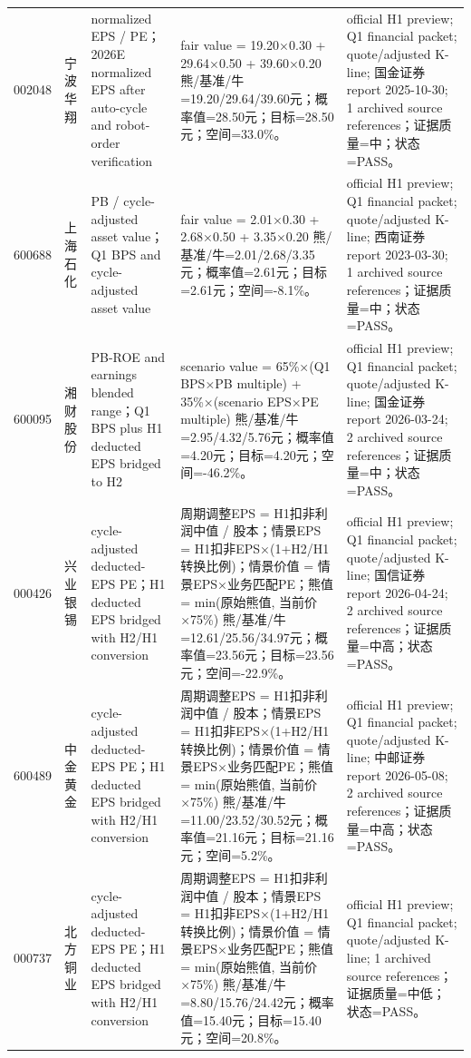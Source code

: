 \begin{longtable}{L{0.85cm}L{1.55cm}L{2.25cm}L{6.0cm}L{4.0cm}}
002048 & 宁波华翔 & normalized EPS / PE；2026E normalized EPS after auto-cycle and robot-order verification & fair value = 19.20×0.30 + 29.64×0.50 + 39.60×0.20 熊/基准/牛=19.20/29.64/39.60元；概率值=28.50元；目标=28.50元；空间=33.0\%。 & official H1 preview; Q1 financial packet; quote/adjusted K-line; 国金证券 report 2025-10-30; 1 archived source references；证据质量=中；状态=PASS。 \\
600688 & 上海石化 & PB / cycle-adjusted asset value；Q1 BPS and cycle-adjusted asset value & fair value = 2.01×0.30 + 2.68×0.50 + 3.35×0.20 熊/基准/牛=2.01/2.68/3.35元；概率值=2.61元；目标=2.61元；空间=-8.1\%。 & official H1 preview; Q1 financial packet; quote/adjusted K-line; 西南证券 report 2023-03-30; 1 archived source references；证据质量=中；状态=PASS。 \\
600095 & 湘财股份 & PB-ROE and earnings blended range；Q1 BPS plus H1 deducted EPS bridged to H2 & scenario value = 65\%×(Q1 BPS×PB multiple) + 35\%×(scenario EPS×PE multiple) 熊/基准/牛=2.95/4.32/5.76元；概率值=4.20元；目标=4.20元；空间=-46.2\%。 & official H1 preview; Q1 financial packet; quote/adjusted K-line; 国金证券 report 2026-03-24; 2 archived source references；证据质量=中；状态=PASS。 \\
000426 & 兴业银锡 & cycle-adjusted deducted-EPS PE；H1 deducted EPS bridged with H2/H1 conversion & 周期调整EPS = H1扣非利润中值 / 股本；情景EPS = H1扣非EPS×(1+H2/H1转换比例)；情景价值 = 情景EPS×业务匹配PE；熊值 = min(原始熊值, 当前价×75\%) 熊/基准/牛=12.61/25.56/34.97元；概率值=23.56元；目标=23.56元；空间=-22.9\%。 & official H1 preview; Q1 financial packet; quote/adjusted K-line; 国信证券 report 2026-04-24; 2 archived source references；证据质量=中高；状态=PASS。 \\
600489 & 中金黄金 & cycle-adjusted deducted-EPS PE；H1 deducted EPS bridged with H2/H1 conversion & 周期调整EPS = H1扣非利润中值 / 股本；情景EPS = H1扣非EPS×(1+H2/H1转换比例)；情景价值 = 情景EPS×业务匹配PE；熊值 = min(原始熊值, 当前价×75\%) 熊/基准/牛=11.00/23.52/30.52元；概率值=21.16元；目标=21.16元；空间=5.2\%。 & official H1 preview; Q1 financial packet; quote/adjusted K-line; 中邮证券 report 2026-05-08; 2 archived source references；证据质量=中高；状态=PASS。 \\
000737 & 北方铜业 & cycle-adjusted deducted-EPS PE；H1 deducted EPS bridged with H2/H1 conversion & 周期调整EPS = H1扣非利润中值 / 股本；情景EPS = H1扣非EPS×(1+H2/H1转换比例)；情景价值 = 情景EPS×业务匹配PE；熊值 = min(原始熊值, 当前价×75\%) 熊/基准/牛=8.80/15.76/24.42元；概率值=15.40元；目标=15.40元；空间=20.8\%。 & official H1 preview; Q1 financial packet; quote/adjusted K-line; 1 archived source references；证据质量=中低；状态=PASS。 \\

\end{longtable}
